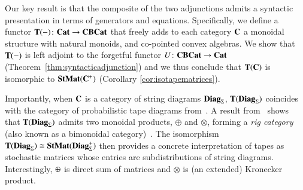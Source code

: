Our key result is that the composite of the two adjunctions admits a syntactic presentation in terms of generators and equations. Specifically, we define a functor \( \mathbf{T}(-) \colon \mathbf{Cat} \to \mathbf{CBCat} \) that freely adds to each category \( \mathbf{C} \) a monoidal structure with natural monoids, and co-pointed convex algebras. We show that \( \mathbf{T}(-) \) is left adjoint to the forgetful functor \( U \colon \mathbf{CBCat} \to \mathbf{Cat} \) (Theorem~\ref{thm:syntacticadjunction}) and we thus conclude that $\mathbf{T}(\mathbf{C})$ is isomorphic to $\mathbf{StMat}(\mathbf{C}^+)$ (Corollary \ref{cor:isotapematrices}). %



Importantly, when \( \mathbf{C} \) is a category of string diagrams \( \mathbf{Diag}_{\Sigma} \), \( \mathbf{T}(\mathbf{Diag}_{\Sigma}) \) coincides with the category of probabilistic tape diagrams from~\cite{bonchi2025tapediagramsmonoidalmonads}. A result from~\cite{bonchi2025tapediagramsmonoidalmonads} shows that \( \mathbf{T}(\mathbf{Diag}_{\Sigma}) \) admits two monoidal products, \( \oplus \) and \( \otimes \), forming a \emph{rig category} (also known as a bimonoidal category)~\cite{laplaza_coherence_1972,johnson2021bimonoidal}. The isomorphism \( \mathbf{T}(\mathbf{Diag}_{\Sigma}) \cong \mathbf{StMat}(\mathbf{Diag}_{\Sigma}^+) \) then provides a concrete interpretation of tapes as stochastic matrices whose entries are  subdistributions of string diagrams. Interestingly, $\oplus$ is direct sum of matrices and $\otimes$ is (an extended) Kronecker product.

